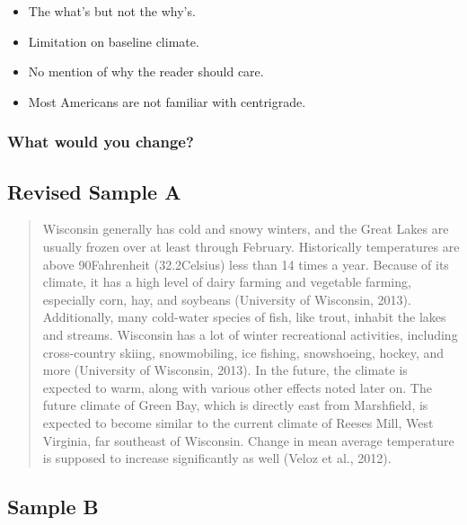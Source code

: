 \documentclass{article}\usepackage[]{graphicx}\usepackage[]{color}
\begin{document}
\begin{itemize}
\item The what's but not the why's. 
\item Limitation on baseline climate. 
\item No mention of why the reader should care.
\item Most Americans are not familiar with centrigrade.
\end{itemize}

\subsubsection{What would you change?}

\subsection{Revised Sample A}

\begin{quote}
Wisconsin generally has cold and snowy winters, and the Great Lakes are usually frozen over at least through February. Historically temperatures are above 90\degree Fahrenheit (32.2\degree Celsius) less than 14 times a year. Because of its climate, it has a high level of dairy farming and vegetable farming, especially corn, hay, and soybeans (University of Wisconsin, 2013). Additionally, many cold-water species of fish, like trout, inhabit the lakes and streams. Wisconsin has a lot of winter recreational activities, including cross-country skiing, snowmobiling, ice fishing, snowshoeing, hockey, and more (University of Wisconsin, 2013). In the future, the climate is expected to warm, along with various other effects noted later on. The future climate of Green Bay, which is directly east from Marshfield, is expected to become similar to the current climate of Reeses Mill, West Virginia, far southeast of Wisconsin. Change in mean average temperature is supposed to increase significantly as well (Veloz et al., 2012). 
\end{quote}


\subsection{Sample B}
\end{document}
